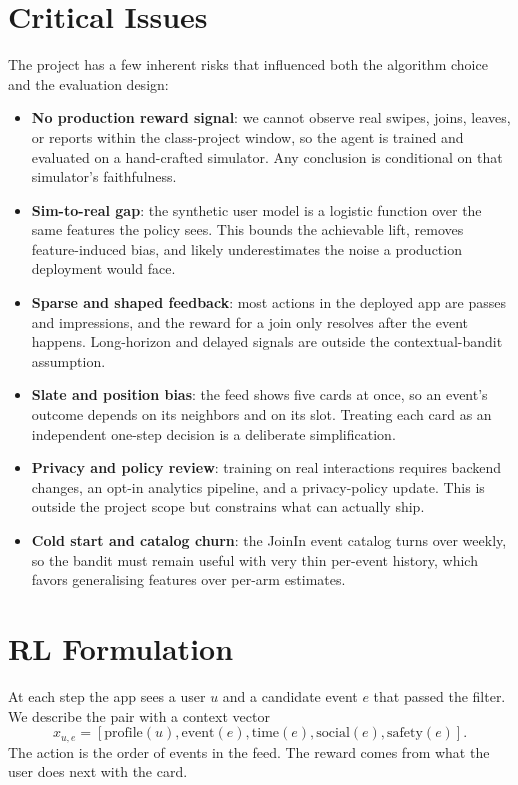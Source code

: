 \documentclass{article}
\begin{document}
\section{Critical Issues}
The project has a few inherent risks that influenced both the algorithm choice and the evaluation design:
\begin{itemize}
    \item \textbf{No production reward signal}: we cannot observe real swipes, joins, leaves, or reports within the class-project window, so the agent is trained and evaluated on a hand-crafted simulator. Any conclusion is conditional on that simulator's faithfulness.
    \item \textbf{Sim-to-real gap}: the synthetic user model is a logistic function over the same features the policy sees. This bounds the achievable lift, removes feature-induced bias, and likely underestimates the noise a production deployment would face.
    \item \textbf{Sparse and shaped feedback}: most actions in the deployed app are passes and impressions, and the reward for a join only resolves after the event happens. Long-horizon and delayed signals are outside the contextual-bandit assumption.
    \item \textbf{Slate and position bias}: the feed shows five cards at once, so an event's outcome depends on its neighbors and on its slot. Treating each card as an independent one-step decision is a deliberate simplification.
    \item \textbf{Privacy and policy review}: training on real interactions requires backend changes, an opt-in analytics pipeline, and a privacy-policy update. This is outside the project scope but constrains what can actually ship.
    \item \textbf{Cold start and catalog churn}: the JoinIn event catalog turns over weekly, so the bandit must remain useful with very thin per-event history, which favors generalising features over per-arm estimates.
\end{itemize}

\section{RL Formulation}
At each step the app sees a user $u$ and a candidate event $e$ that passed the filter. We describe the pair with a context vector
\[
x_{u,e} = [\text{profile}(u), \text{event}(e), \text{time}(e), \text{social}(e), \text{safety}(e)].
\]
The action is the order of events in the feed. The reward comes from what the user does next with the card.
\end{document}
